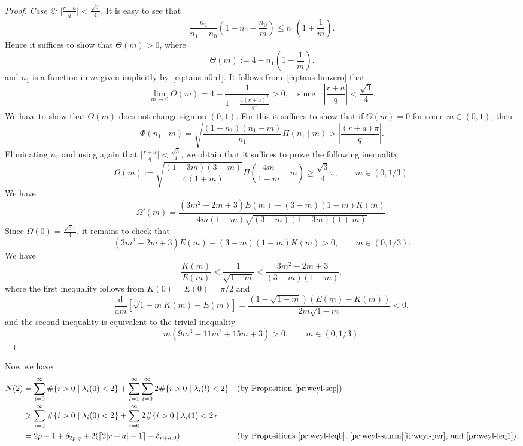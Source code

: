 \documentclass{amsart}
\let\le\leqslant
\let\ge\geqslant
\renewcommand{\d}{\mathrm{d}}
\newcommand{\bigmid}{\,\middle\vert\,}
\theoremstyle{plain}
\theoremstyle{definition}
\theoremstyle{remark}
\begin{document}
\begin{proof}
\textit{Case 2: \(\bigl|\frac{r+a}q\bigr|<\frac{\sqrt 3}4\).} It is easy to see
that
\[
\frac{n_1}{n_1-n_0}\left(1-n_0-\frac{n_0}m\right)\le
n_1\left(1+\frac{1}m\right).
\]
Hence it suffices to show that \(\Theta(m)>0\), where
\[
\Theta(m):=4-n_1\left(1+\frac{1}m\right).
\]
and \(n_1\) is a function in \(m\) given implicitly by~\eqref{eq:taus-n0n1}. It
follows from~\eqref{eq:taus-limzero} that
\[
\lim_{m\to 0}\Theta(m)=4-\frac{1}{1-\frac{4(r+a)^2}{q^2}}>0,\quad\text{since}\quad
\left|\frac{r+a}q\right|<\frac{\sqrt 3}4.
\]
We have to show that \(\Theta(m)\) does not change sign on \((0,1)\). For this
it suffices to show that if \(\Theta(m)=0\) for some \(m\in (0,1)\), then
\[
\Phi(n_1\mid m)=\sqrt{\frac{(1-n_1)(n_1-m)}{n_1}}\Pi(n_1\mid m)>
\left|\frac{(r+a)\pi}q\right|.
\]
Eliminating \(n_1\) and using again that \(\bigl|\frac{r+a}q\bigr|<\frac{\sqrt
3}4\), we obtain that it suffices to prove the following inequality
\[
\Omega(m):=\sqrt{\frac{(1-3m)(3-m)}{4(1+m)}}\Pi\left(\frac{4m}{1+m}\bigmid
m\right)\ge\frac{\sqrt 3}4\pi,\qquad m\in (0,1/3).
\]
We have
\[
\Omega'(m)=\frac{(3m^2-2m+3)E(m)-(3-m)(1-m)K(m)}{4m(1-m)\sqrt{(3-m)(1-3m)(1+m)}}.
\]
Since \(\Omega(0)=\frac{\sqrt 3\pi}4\), it remains to check that
\[
(3m^2-2m+3)E(m)-(3-m)(1-m)K(m)>0,\qquad m\in (0,1/3).
\]
We have
\[
\frac{K(m)}{E(m)}<\frac{1}{\sqrt{1-m}}<\frac{3m^2-2m+3}{(3-m)(1-m)},
\]
where the first inequality follows from \(K(0)=E(0)=\pi/2\) and
\[
\frac{\d}{\d m}\left[\sqrt{1-m}K(m)-E(m)\right]=
\frac{(1-\sqrt{1-m})(E(m)-K(m))}{2m\sqrt{1-m}}<0,
\]
and the second inequality is equivalent to the trivial inequality
\[
m(9m^3-11m^2+15m+3)>0,\qquad m\in (0,1/3).
\]
\end{proof}

Now we have
\begin{align*}
N(2)&=\sum_{i=0}^\infty\#\{i>0\mid\lambda_i(0)<2\}+
\sum_{l=1}^\infty\sum_{i=0}^\infty 2\#\{i>0\mid\lambda_i(l)<2\}
&&\text{(by Proposition~\ref{pr:weyl-sep})}\\
&\ge\sum_{i=0}^\infty\#\{i>0\mid\lambda_i(0)<2\}+
\sum_{i=0}^\infty 2\#\{i>0\mid\lambda_i(1)<2\}\\
&=2p-1+\delta_{2p,q}+2(\lceil 2|r+a|-1\rceil+\delta_{r+a,0})
&&\text{(by
Propositions~\ref{pr:weyl-leq0}, \ref{pr:weyl-sturm}\ref{it:weyl-per},
and \ref{pr:weyl-leq1})}.
\end{align*}
\end{document}
